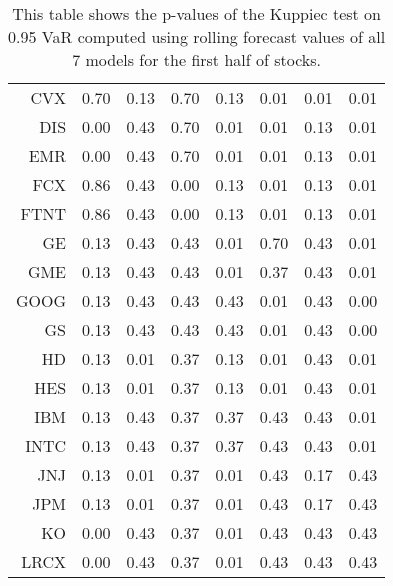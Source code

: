 \begin{table}[ht]
\begin{tabular}{rrrrrrrr}
  CVX & 0.70 & 0.13 & 0.70 & 0.13 & 0.01 & 0.01 & 0.01 \\ 
  DIS & 0.00 & 0.43 & 0.70 & 0.01 & 0.01 & 0.13 & 0.01 \\ 
  EMR & 0.00 & 0.43 & 0.70 & 0.01 & 0.01 & 0.13 & 0.01 \\ 
  FCX & 0.86 & 0.43 & 0.00 & 0.13 & 0.01 & 0.13 & 0.01 \\ 
  FTNT & 0.86 & 0.43 & 0.00 & 0.13 & 0.01 & 0.13 & 0.01 \\ 
  GE & 0.13 & 0.43 & 0.43 & 0.01 & 0.70 & 0.43 & 0.01 \\ 
  GME & 0.13 & 0.43 & 0.43 & 0.01 & 0.37 & 0.43 & 0.01 \\ 
  GOOG & 0.13 & 0.43 & 0.43 & 0.43 & 0.01 & 0.43 & 0.00 \\ 
  GS & 0.13 & 0.43 & 0.43 & 0.43 & 0.01 & 0.43 & 0.00 \\ 
  HD & 0.13 & 0.01 & 0.37 & 0.13 & 0.01 & 0.43 & 0.01 \\ 
  HES & 0.13 & 0.01 & 0.37 & 0.13 & 0.01 & 0.43 & 0.01 \\ 
  IBM & 0.13 & 0.43 & 0.37 & 0.37 & 0.43 & 0.43 & 0.01 \\ 
  INTC & 0.13 & 0.43 & 0.37 & 0.37 & 0.43 & 0.43 & 0.01 \\ 
  JNJ & 0.13 & 0.01 & 0.37 & 0.01 & 0.43 & 0.17 & 0.43 \\ 
  JPM & 0.13 & 0.01 & 0.37 & 0.01 & 0.43 & 0.17 & 0.43 \\ 
  KO & 0.00 & 0.43 & 0.37 & 0.01 & 0.43 & 0.43 & 0.43 \\ 
  LRCX & 0.00 & 0.43 & 0.37 & 0.01 & 0.43 & 0.43 & 0.43 \\ 
   \hline
\end{tabular}
\caption[Kupiec test p-values, alpha =0.95 (1)]{This table shows the p-values of the Kuppiec test on 0.95 VaR computed using rolling forecast values of all 7 models for the first half of stocks.} 
\label{Table:Kupiec_test_rolling_0.95_1}
\end{table}
